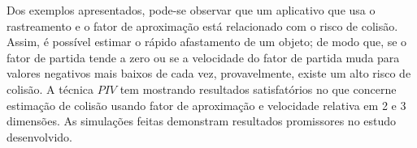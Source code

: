 
\begin{comment}
From the presented examples,
it can be observed that one application that uses the tracking
and the departure factor is related with the risk of collision.
It is possible to estimate how of fast an object is departing.
Thus, if the  departure factor tends to zero or 
if the velocity of departure factor changes to lower negatives values every time, 
probably, there is a high risk of collision. The $PIV$ technique has presented satisfactory results. 
It can be concluded that estimating collision using velocity of departure factor, 
tracking of objects in 2 or 3 dimensions, and departure distance
relative to the first position of $ROI$. 
The simulations in both cases has given promissory results.
\end{comment}

Dos exemplos apresentados, pode-se observar que um aplicativo 
que usa o rastreamento e o fator de aproximação está relacionado com o risco de colisão.
Assim, é possível estimar o rápido afastamento de um objeto;
de modo que, se o fator de partida tende a zero ou se a velocidade do fator de partida muda 
para valores negativos mais baixos de cada vez,
provavelmente, existe um alto risco de colisão.
A técnica $PIV$ tem mostrando resultados satisfatórios no que concerne estimação de colisão usando 
fator de aproximação e velocidade relativa em 2 e 3 dimensões. As simulações feitas demonstram 
resultados promissores no estudo desenvolvido.
